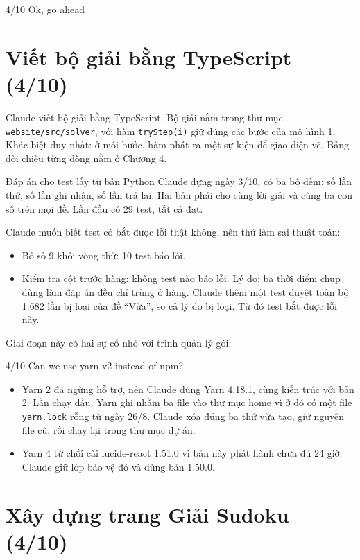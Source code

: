 \begin{promptbox}{4/10}
Ok, go ahead
\end{promptbox}

\section{Viết bộ giải bằng TypeScript (4/10)}

Claude viết bộ giải bằng TypeScript. Bộ giải nằm trong thư mục \texttt{website/src/solver}, với hàm \texttt{tryStep(i)} giữ đúng các bước của mô hình 1. Khác biệt duy nhất: ở mỗi bước, hàm phát ra một sự kiện để giao diện vẽ. Bảng đối chiếu từng dòng nằm ở Chương 4.

Đáp án cho test lấy từ bản Python Claude dựng ngày 3/10, có ba bộ đếm: số lần thử, số lần ghi nhận, số lần trả lại. Hai bản phải cho cùng lời giải và cùng ba con số trên mọi đề. Lần đầu có 29 test, tất cả đạt.

Claude muốn biết test có bắt được lỗi thật không, nên thử làm sai thuật toán:

\begin{itemize}
  \item Bỏ số 9 khỏi vòng thử: 10 test báo lỗi.
  \item Kiểm tra cột trước hàng: không test nào báo lỗi. Lý do: ba thời điểm chụp dùng làm đáp án đều chỉ trùng ở hàng. Claude thêm một test duyệt toàn bộ 1.682 lần bị loại của đề ``Vừa'', so cả lý do bị loại. Từ đó test bắt được lỗi này.
\end{itemize}

Giai đoạn này có hai sự cố nhỏ với trình quản lý gói:

\begin{promptbox}{4/10}
Can we use yarn v2 instead of npm?
\end{promptbox}

\begin{itemize}
  \item Yarn 2 đã ngừng hỗ trợ, nên Claude dùng Yarn 4.18.1, cùng kiến trúc với bản 2. Lần chạy đầu, Yarn ghi nhầm ba file vào thư mục home vì ở đó có một file \texttt{yarn.lock} rỗng từ ngày 26/8. Claude xóa đúng ba thứ vừa tạo, giữ nguyên file cũ, rồi chạy lại trong thư mục dự án.
  \item Yarn 4 từ chối cài lucide-react 1.51.0 vì bản này phát hành chưa đủ 24 giờ. Claude giữ lớp bảo vệ đó và dùng bản 1.50.0.
\end{itemize}

\section{Xây dựng trang Giải Sudoku (4/10)}

